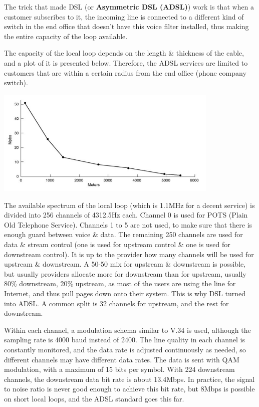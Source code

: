 \documentclass[11pt]{article}
\begin{document}
The trick that made DSL (or \textbf{Asymmetric DSL (ADSL)}) work is that when a customer subscribes to it, the incoming 
line is connected to a different kind of switch in the end office that doesn't have this voice filter installed, thus 
making the entire capacity of the loop available. 

The capacity of the local loop depends on the length \& thickness of the cable, and a plot of it is presented below. 
Therefore, the ADSL services are limited to customers that are within a certain radius from the end office (phone 
company switch). 

\begin{center}
    \includegraphics[width=0.8\textwidth]{dsl.png}
\end{center}

The available spectrum of the local loop (which is 1.1MHz for a decent service) is divided into 256 channels of 4312.5Hz each. 
Channel 0 is used for POTS (Plain Old Telephone Service). 
Channels 1 to 5 are not used, to make sure that there is enough guard between voice \& data. 
The remaining 250 channels are used for data \& stream control (one is used for upstream control \& one is used for 
downstream control). 
It is up to the provider how many channels will be used for upstream \& downstream. 
A 50-50 mix for upstream \& downstream is possible, but usually providers allocate more for downstream than for upstream, 
usually 80\% downstream, 20\% upstream, as most of the users are using the line for Internet, and thus pull pages down 
onto their system. 
This is why DSL turned into ADSL. 
A common split is 32 channels for upstream, and the rest for downstream. 

Within each channel, a modulation schema similar to V.34 is used, although the sampling rate is 4000 baud instead of 2400. 
The line quality in each channel is constantly monitored, and the data rate is adjusted continuously as needed, so 
different channels may have different data rates. 
The data is sent with QAM modulation, with a maximum of 15 bits per symbol. 
With 224 downstream channels, the downstream data bit rate is about 13.4Mbps. 
In practice, the signal to noise ratio is never good enough to achieve this bit rate, but 8Mbps is possible on short local 
loops, and the ADSL standard goes this far. 
\end{document}
